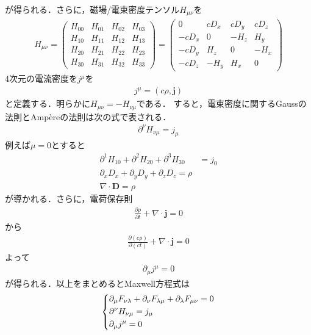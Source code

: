 \documentclass{report}
\begin{document}
  が得られる．さらに，磁場/電束密度テンソル$H_{\mu\nu}$を
  \begin{align}
    H_{\mu\nu}=
    \begin{pmatrix}
      H_{00} & H_{01} & H_{02} & H_{03}\\
      H_{10} & H_{11} & H_{12} & H_{13}\\
      H_{20} & H_{21} & H_{22} & H_{23}\\
      H_{30} & H_{31} & H_{32} & H_{33}
    \end{pmatrix}
    =
    \begin{pmatrix}
      0 & cD_x & cD_y & cD_z \\
      -cD_x & 0 & -H_z & H_y\\
      -cD_y & H_z & 0 & -H_x\\
      -cD_z& -H_y & H_x & 0
    \end{pmatrix}
  \end{align}
  4次元の電流密度を$j^{\mu}$を
  \begin{align}
    j^{\mu} = (c\rho, \bm{j})
  \end{align}
  と定義する．明らかに$H_{\mu\nu} = -H_{\nu\mu}$である．
  すると，電束密度に関するGaussの法則とAmpèreの法則は次の式で表される．
  \begin{align}
    \partial^{\nu}H_{\nu\mu}=j_\mu
  \end{align}
  例えば$\mu=0$とすると
  \begin{align}
    \partial^1H_{10}+\partial^2H_{20} + \partial^3H_{30} &= j_0\\
    \partial_xD_x + \partial_yD_y + \partial_zD_z = \rho\\
    \nabla\cdot\bm{D} = \rho
  \end{align}
  が導かれる．さらに，電荷保存則
  \begin{align}
    \frac{\partial \rho}{\partial t} + \nabla\cdot\bm{j} = 0
  \end{align}
  から
  \begin{align}
    \frac{\partial (c\rho)}{\partial (ct)} + \nabla\cdot\bm{j} = 0
  \end{align}
  よって
  \begin{align}
    \partial_\mu j^\mu = 0
  \end{align}
  が得られる．以上をまとめるとMaxwell方程式は
  \begin{align}
    \begin{dcases}
      \partial_\mu F_{\nu\lambda} + \partial_\nu F_{\lambda\mu} + \partial_\lambda F_{\mu\nu} = 0\\
      \partial^{\nu}H_{\nu\mu}=j_\mu\\
      \partial_\mu j^\mu = 0
    \end{dcases}
  \end{align}
\end{document}
